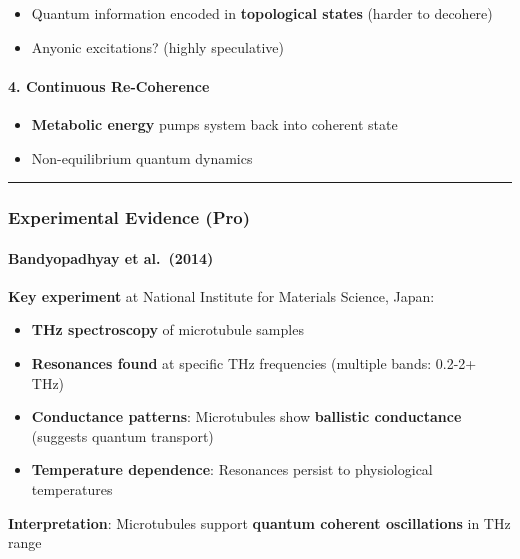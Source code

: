 \begin{itemize}
\tightlist
\item
  Quantum information encoded in \textbf{topological states} (harder to
  decohere)
\item
  Anyonic excitations? (highly speculative)
\end{itemize}

\paragraph{4. Continuous Re-Coherence}\label{continuous-re-coherence}

\begin{itemize}
\tightlist
\item
  \textbf{Metabolic energy} pumps system back into coherent state
\item
  Non-equilibrium quantum dynamics
\end{itemize}

\begin{center}\rule{0.5\linewidth}{0.5pt}\end{center}

\subsubsection{Experimental Evidence
(Pro)}\label{experimental-evidence-pro}

\paragraph{Bandyopadhyay et al.~(2014)}\label{bandyopadhyay-et-al.-2014}

\textbf{Key experiment} at National Institute for Materials Science,
Japan:

\begin{itemize}
\tightlist
\item
  \textbf{THz spectroscopy} of microtubule samples
\item
  \textbf{Resonances found} at specific THz frequencies (multiple bands:
  0.2-2+ THz)
\item
  \textbf{Conductance patterns}: Microtubules show \textbf{ballistic
  conductance} (suggests quantum transport)
\item
  \textbf{Temperature dependence}: Resonances persist to physiological
  temperatures
\end{itemize}

\textbf{Interpretation}: Microtubules support \textbf{quantum coherent oscillations} in THz range


